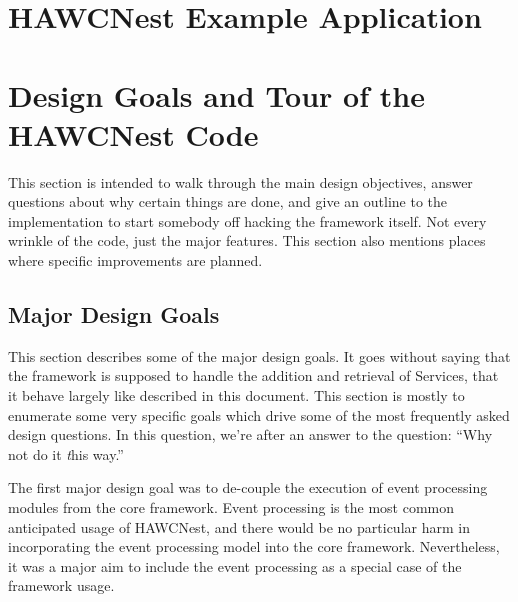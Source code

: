 \documentclass[12pt]{article}
\begin{document}
%
%
%

\newpage
\section{HAWCNest Example Application}
\label{hawcnest-example-appendix}




\newpage
\section{Design Goals and Tour of the HAWCNest Code}

This section is intended to walk through the main design objectives, answer
questions about why certain things are done, and give an outline to the
implementation to start somebody off hacking the framework itself.  Not 
every wrinkle of the code, just the major features. This section also
mentions places where specific improvements are planned.

\subsection{Major Design Goals}

This section describes some of the major design goals. It goes without
saying that the framework is supposed to handle the addition and 
retrieval of Services, that it behave largely like described in this 
document. This section is mostly to enumerate some very specific goals
which drive some of the most frequently asked design questions. 
In this question, we're after an answer to the question: ``Why not do it
{\emph this} way.''  

The first major design goal was to de-couple the execution of event processing
modules from the core framework. Event processing is the most common
anticipated usage of HAWCNest, and there would be no particular harm in
incorporating the event processing model into the core framework. Nevertheless,
it was a major aim to include the event processing as a special case 
of the framework usage.  
\end{document}
